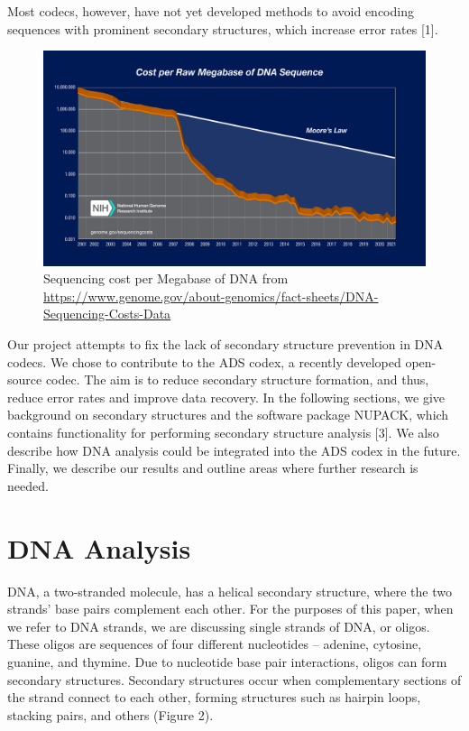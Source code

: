 \documentclass{article}
\begin{document}
Most codecs, however, have not yet developed methods to avoid encoding sequences with prominent secondary structures, which increase error rates [1].

\begin{figure}
\centering
\includegraphics[width=\textwidth]{2021_sequencing_cost_per_Mb.jpg}
\caption{Sequencing cost per Megabase of DNA from \url{https://www.genome.gov/about-genomics/fact-sheets/DNA-Sequencing-Costs-Data}}
\end{figure}

Our project attempts to fix the lack of secondary structure prevention in DNA codecs. We chose to contribute to the ADS codex, a recently developed open-source codec. The aim is to reduce secondary structure formation, and thus, reduce error rates and improve data recovery. In the following sections, we give background on secondary structures and the software package NUPACK, which contains functionality for performing secondary structure analysis [3]. We also describe how DNA analysis could be integrated into the ADS codex in the future. Finally, we describe our results and outline areas where further research is needed.

\section{DNA Analysis}
DNA, a two-stranded molecule, has a helical secondary structure, where the two strands' base pairs complement each other. For the purposes of this paper, when we refer to DNA strands, we are discussing single strands of DNA, or oligos. These oligos are sequences of four different nucleotides -- adenine, cytosine, guanine, and thymine. Due to nucleotide base pair interactions, oligos can form secondary structures. Secondary structures occur when complementary sections of the strand connect to each other, forming structures such as hairpin loops, stacking pairs, and others (Figure 2). 
\end{document}
